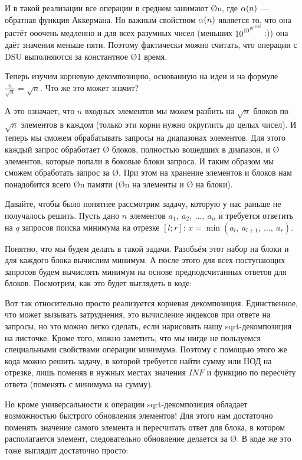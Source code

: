 
И в такой реализации все операции в среднем занимают \O{\ac{n}}, где $\alpha(n)$ — обратная функция Аккермана. Но важным свойством $\alpha(n)$ является то, что она растёт ооочень медленно и для всех разумных чисел (меньших $10^{10^{10^{19500}}}$ :)) она даёт значения меньше пяти. Поэтому фактически можно считать, что операции с DSU выполняются за константное \O{1} время.


Теперь изучим корневую декомпозицию, основанную на идеи  и на формуле $\frac{n}{\sqrt{n}} = \sqrt{n}$. Что же это может значит?

А это означает, что $n$ входных элементов мы можем разбить на $\sqrt{n}$ блоков по $\sqrt{n}$ элементов в каждом (только эти корни нужно округлить до целых чисел). И теперь мы сможем обрабатывать запросы на диапазонах элементов. Для этого каждый запрос обработает \O{} блоков, полностью вошедших в диапазон, и \O{} элементов, которые попали в боковые блоки запроса. И таким образом мы сможем обработать запрос за \O{}. При этом на хранение элементов и блоков нам понадобится всего \O{n} памяти (\O{n} на элементы и \O{} на блоки).

Давайте, чтобы было понятнее рассмотрим задачу, которую у нас раньше не получалось решить. Пусть дано $n$ элементов $a_1,\ a_2,\ \ldots,\ a_n$ и требуется ответить на $q$ запросов поиска минимума на отрезке $[l; r]$: $x = \min(a_l,\ a_{l + 1},\ \ldots,\ a_r)$.

Понятно, что мы будем делать в такой задачи. Разобьём этот набор на блоки и для каждого блока вычислим минимум. А после этого для всех поступающих запросов будем вычислять минимум на основе предподсчитанных ответов для блоков. Посмотрим, как это будет выглядеть в коде:


Вот так относительно просто реализуется корневая декомпозиция. Единственное, что может вызывать затруднения, это вычисление индексов при ответе на запросы, но это можно легко сделать, если нарисовать нашу sqrt-декомпозиция на листочке. Кроме того, можно заметить, что мы нигде не пользуемся специальными свойствами операции минимума. Поэтому с помощью этого же кода можно решить задачу, в которой требуется найти сумму или НОД на отрезке, лишь поменяв в нужных местах значения $INF$ и функцию по пересчёту ответа (поменять с минимума на сумму).

Но кроме универсальности к операции sqrt-декомпозиция обладает возможностью быстрого обновления элементов! Для этого нам достаточно поменять значение самого элемента и пересчитать ответ для блока, в котором располагается элемент, следовательно обновление делается за \O{}. В коде же это тоже выглядит достаточно просто:

